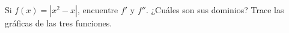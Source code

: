 \item Si $f(x) = |x^2 - x|$, encuentre $f'$ y $f''$. ¿Cuáles son sus dominios? Trace las gráficas de las tres funciones.
